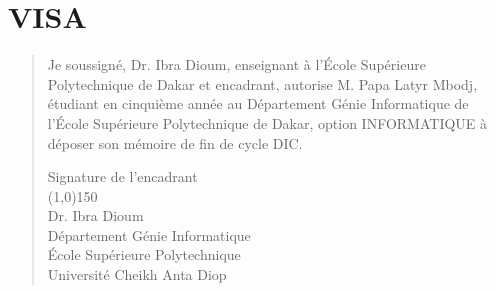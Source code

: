 %
%
%
%
%
%
\chapter*{VISA}
\begin{SingleSpace}
	\begin{quote}
		\large {
			Je soussigné, Dr. Ibra Dioum, enseignant à l’École Supérieure
			Polytechnique de Dakar et encadrant, autorise M. Papa Latyr Mbodj, étudiant en cinquième année au Département Génie Informatique de l’École Supérieure
			Polytechnique de Dakar, option INFORMATIQUE à déposer son mémoire de fin de cycle DIC.} 
		\vspace{6cm}
		\begin{center}
			\large{Signature de l'encadrant}\\
			\vspace{12mm}
			\line(1,0){150}\\
			\large {Dr. Ibra Dioum}\\
			\vspace{2mm}
			\large {Département Génie Informatique}\\
			\large {École Supérieure Polytechnique}\\
			\large {Université Cheikh Anta Diop}\\
		\end{center}
		
		
	\end{quote}
\end{SingleSpace}
